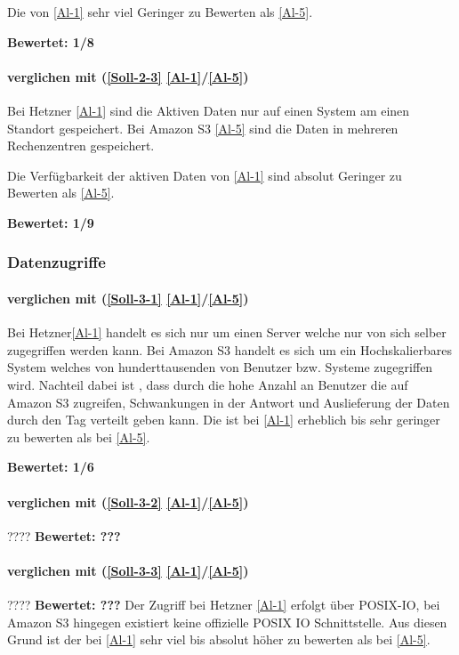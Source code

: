 Die  von \ref{Al-1} sehr viel Geringer zu Bewerten als \ref{Al-5}.

\textbf{Bewertet: 1/8}

\paragraph*{  verglichen mit  (\ref{Soll-2-3}  \ref{Al-1}/\ref{Al-5})}
Bei Hetzner \ref{Al-1} sind die Aktiven Daten nur auf einen System am einen Standort gespeichert. Bei Amazon S3 \ref{Al-5} sind die Daten in mehreren Rechenzentren gespeichert.

Die  Verfügbarkeit der aktiven Daten von \ref{Al-1} sind absolut Geringer zu Bewerten als \ref{Al-5}.

\textbf{Bewertet: 1/9}

\subsubsection{Datenzugriffe}

\paragraph*{  verglichen mit  (\ref{Soll-3-1} \ref{Al-1}/\ref{Al-5})}
Bei Hetzner\ref{Al-1} handelt es sich nur um einen Server welche nur von sich selber zugegriffen werden kann. Bei Amazon S3 handelt es sich um ein Hochskalierbares System welches von hunderttausenden von Benutzer bzw. Systeme zugegriffen wird. Nachteil dabei ist , dass durch die hohe Anzahl an Benutzer die auf Amazon S3 zugreifen, Schwankungen in der Antwort und Auslieferung der Daten durch den Tag verteilt geben kann.
Die  ist bei \ref{Al-1} erheblich bis sehr geringer zu bewerten als bei \ref{Al-5}.

\textbf{Bewertet: 1/6}

\paragraph*{  verglichen mit  (\ref{Soll-3-2} \ref{Al-1}/\ref{Al-5})}
????
\textbf{Bewertet: ???} 

\paragraph*{  verglichen mit  (\ref{Soll-3-3} \ref{Al-1}/\ref{Al-5})}
????
\textbf{Bewertet: ???} 
Der Zugriff bei Hetzner \ref{Al-1} erfolgt über POSIX-IO, bei Amazon S3 hingegen existiert keine offizielle POSIX IO Schnittstelle. Aus diesen Grund ist der  bei \ref{Al-1} sehr viel  bis absolut höher zu bewerten als bei \ref{Al-5}.

